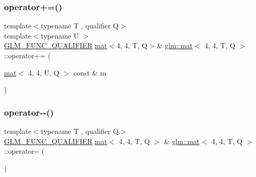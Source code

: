 \subsubsection{\texorpdfstring{operator+=()}{operator+=()}\hspace{0.1cm}{\footnotesize\ttfamily [4/4]}}
{\footnotesize\ttfamily template$<$typename T , qualifier Q$>$ \\
template$<$typename U $>$ \\
\mbox{\hyperlink{setup_8hpp_a33fdea6f91c5f834105f7415e2a64407}{G\+L\+M\+\_\+\+F\+U\+N\+C\+\_\+\+Q\+U\+A\+L\+I\+F\+I\+ER}} \mbox{\hyperlink{structglm_1_1mat}{mat}}$<$4, 4, T, Q$>$\& \mbox{\hyperlink{structglm_1_1mat}{glm\+::mat}}$<$ 4, 4, T, Q $>$\+::operator+= (\begin{DoxyParamCaption}\item[{\mbox{\hyperlink{structglm_1_1mat}{mat}}$<$ 4, 4, U, Q $>$ const \&}]{m }\end{DoxyParamCaption})}

\mbox{\label{structglm_1_1mat_3_014_00_014_00_01_t_00_01_q_01_4_a3c62ee9d03614c428b3e7d81dac27f8c}} 
\subsubsection{\texorpdfstring{operator-\/-\/()}{operator--()}\hspace{0.1cm}{\footnotesize\ttfamily [1/2]}}
{\footnotesize\ttfamily template$<$typename T , qualifier Q$>$ \\
\mbox{\hyperlink{setup_8hpp_a33fdea6f91c5f834105f7415e2a64407}{G\+L\+M\+\_\+\+F\+U\+N\+C\+\_\+\+Q\+U\+A\+L\+I\+F\+I\+ER}} \mbox{\hyperlink{structglm_1_1mat}{mat}}$<$ 4, 4, T, Q $>$ \& \mbox{\hyperlink{structglm_1_1mat}{glm\+::mat}}$<$ 4, 4, T, Q $>$\+::operator-\/-\/ (\begin{DoxyParamCaption}{ }\end{DoxyParamCaption})}

\mbox{\label{structglm_1_1mat_3_014_00_014_00_01_t_00_01_q_01_4_a3f3b1e563c8dcf771cb1ab9767869232}} 
